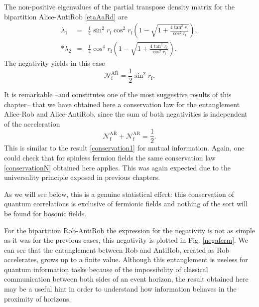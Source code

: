 The non-positive eigenvalues of the partial transpose density matrix for the bipartition Alice-AntiRob \eqref{etaAaRd} are
\begin{eqnarray}\label{eigetaAaRf}
\nonumber \lambda_{1}&=&\frac14\sin^2 r_\text{f}\cos^2 r_\text{f}\left(1-\sqrt{1+\frac{4\tan^2 r_\text{f}}{\cos^2 r_\text{f}}}\right),\\*
\lambda_{2}&=&\frac14\cos^4 r_\text{f}\left(1-\sqrt{1+\frac{4\tan^2 r_\text{f}}{\cos^2 r_\text{f}}}\right).
\end{eqnarray}
The negativity yields in this case
\begin{equation}
\mathcal{N}^{\text{A}{\bar{\text{R}}}}_\text{f}=\frac12\sin^2 r_\text{f}.\end{equation}

It is remarkable --and constitutes one of the most suggestive results of this chapter-- that we have obtained here a conservation law for the entanglement Alice-Rob and Alice-AntiRob, since the sum of both negativities is independent of the acceleration
\begin{equation}\label{conservationN}
\mathcal{N}^{\text{A}{\bar{\text{R}}}}_\text{f} +\mathcal{N}_\text{f}^\text{AR} =\frac12.
\end{equation}
This is similar to the result \eqref{conservation1} for mutual information. Again, one could check that for spinless fermion fields the same  conservation law \eqref{conservationN} obtained here applies. This was again expected due to the universality principle exposed in previous chapters.

As we will see below, this is a genuine statistical effect: this conservation of quantum correlations is exclusive of fermionic fields and nothing of the sort will be found for bosonic fields. 


For the bipartition Rob-AntiRob the expression for the negativity is not as simple as it was for the previous cases, this negativity is plotted in Fig. \ref{negaferm}. We can see that the entanglement between Rob and AntiRob, created as Rob accelerates, grows up to a finite value. Although this entanglement is useless for quantum information tasks because of the impossibility of classical communication between both sides of an event horizon, the result obtained here may be a useful hint in order to understand how information behaves in the proximity of horizons.

